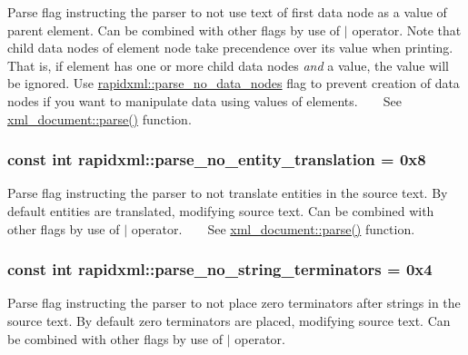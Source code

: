 Parse flag instructing the parser to not use text of first data node as a value of parent element. Can be combined with other flags by use of $\vert$ operator. Note that child data nodes of element node take precendence over its value when printing. That is, if element has one or more child data nodes {\itshape and} a value, the value will be ignored. Use \hyperlink{namespacerapidxml_ac2d21ef14a4e8936b94aca5d38b1a74d}{rapidxml\+::parse\+\_\+no\+\_\+data\+\_\+nodes} flag to prevent creation of data nodes if you want to manipulate data using values of elements. ~\newline
~\newline
 See \hyperlink{singletonrapidxml_1_1xml__document_ac6e73ff9ac323bf5a370c38feb03a6b1}{xml\+\_\+document\+::parse()} function. \hypertarget{namespacerapidxml_a89113c103ffaf77615d1aa330c8dcca8}{
\subsubsection[{parse\+\_\+no\+\_\+entity\+\_\+translation}]{\setlength{\rightskip}{0pt plus 5cm}const int rapidxml\+::parse\+\_\+no\+\_\+entity\+\_\+translation = 0x8}}\label{namespacerapidxml_a89113c103ffaf77615d1aa330c8dcca8}
Parse flag instructing the parser to not translate entities in the source text. By default entities are translated, modifying source text. Can be combined with other flags by use of $\vert$ operator. ~\newline
~\newline
 See \hyperlink{singletonrapidxml_1_1xml__document_ac6e73ff9ac323bf5a370c38feb03a6b1}{xml\+\_\+document\+::parse()} function. \hypertarget{namespacerapidxml_af3fc88ba6bee33482a2db81b1da36ea1}{
\subsubsection[{parse\+\_\+no\+\_\+string\+\_\+terminators}]{\setlength{\rightskip}{0pt plus 5cm}const int rapidxml\+::parse\+\_\+no\+\_\+string\+\_\+terminators = 0x4}}\label{namespacerapidxml_af3fc88ba6bee33482a2db81b1da36ea1}
Parse flag instructing the parser to not place zero terminators after strings in the source text. By default zero terminators are placed, modifying source text. Can be combined with other flags by use of $\vert$ operator. ~\newline
